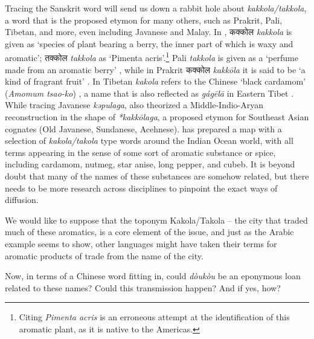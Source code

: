 \documentclass[12pt]{article}
\newcommand{\bo}[1]{\tibetanfont{#1}\rmfamily}
\newcommand{\tc}[1]{\traditionalchinesefont{#1}\rmfamily}
\newcommand{\jv}[1]{\javanesefont{#1}\rmfamily}
\begin{document}
Tracing the Sanskrit word will send us down a rabbit hole about \textit{kakkola/takkola}, a word that is the proposed etymon for many others, such as Prakrit, Pali, Tibetan, and more, even including Javanese and Malay. In \textcite[431, 241]{monier-williams_1899_sanskritenglish}, कक्कोल \textit{kakkola} is given as `species of plant bearing a berry, the inner part of which is waxy and aromatic'; तक्कोल \textit{takkola} as `Pimenta acris'.\footnote{Citing \textit{Pimenta acris} is an erroneous attempt at the identification of this aromatic plant, as it is native to the Americas.} Pali \textit{takkola} is given as a `perfume made from an aromatic berry' \parencite[292]{palitextsociety_1921_pali}, while in Prakrit कक्कोल \textit{kakkōla} it is said to be `a kind of fragrant fruit' \parencite[213]{sheth_1923_paiasaddamahannavo}. In Tibetan \bo{ཀ་ཀོ་ལ} \textit{kakola} refers to the Chinese `black cardamom' (\textit{Amomum tsao-ko}) \parencite[1]{goldstein_2001_new}, a name that is also reflected as \tc{嘎哥拉} \textit{gágēlā} in Eastern Tibet \parencite{hu_2005_food}. While tracing Javanese \textit{kəpulaga}, \textcite[417]{hoogervorst_2017_role} also theorized a Middle-Indio-Aryan reconstruction in the shape of \textit{*kakkōlaga}, a proposed etymon for Southeast Asian cognates (Old Javanese, Sundanese, Acehnese). \textcite[20]{hoogervorst_2013_southeast} has prepared a map with a selection of \textit{kakola/takola} type words around the Indian Ocean world, with all terms appearing in the sense of some sort of aromatic substance or spice, including cardamom, nutmeg, star anise, long pepper, and cubeb. It is beyond doubt that many of the names of these substances are somehow related, but there needs to be more research across disciplines to pinpoint the exact ways of diffusion. 




We would like to suppose that the toponym Kakola/Takola -- the city that traded much of these aromatics, is a core element of the issue, and just as the Arabic example seems to show, other languages might have taken their terms for aromatic products of trade from the name of the city. 

Now, in terms of a Chinese word fitting in, could \tc{豆蔻} \textit{dòukòu} be an eponymous loan related to these names? Could this transmission happen? And if yes, how?
\end{document}
